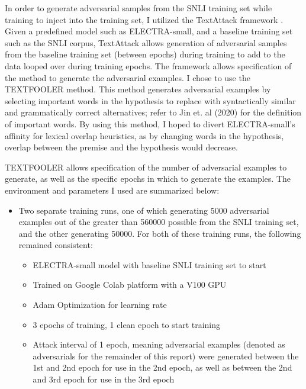 \documentclass[11pt,a4paper]{article}
\begin{document}
In order to generate adversarial samples from the SNLI training set while training to inject into the training set, I utilized the TextAttack framework \cite{DBLP:journals/corr/abs-2005-05909}. Given a predefined model such as ELECTRA-small, and a baseline training set such as the SNLI corpus, TextAttack allows generation of adversarial samples from the baseline training set (between epochs) during training to add to the data looped over during training epochs. The framework allows specification of the method to generate the adversarial examples. I chose to use the TEXTFOOLER \cite{DBLP:journals/corr/abs-1907-11932} method. This method generates adversarial examples by selecting important words in the hypothesis to replace with syntactically similar and grammatically correct alternatives; refer to Jin et. al (2020) for the definition of important words. By using this method, I hoped to divert ELECTRA-small's affinity for lexical overlap heuristics, as by changing words in the hypothesis, overlap between the premise and the hypothesis would decrease.

TEXTFOOLER allows specification of the number of adversarial examples to generate, as well as the specific epochs in which to generate the examples. The environment and parameters I used are summarized below:

\begin{itemize}
\tiny
\item Two separate training runs, one of which generating 5000 adversarial examples out of the greater than 560000 possible from the SNLI training set, and the other generating 50000. For both of these training runs, the following remained consistent:
\begin{itemize}
    \item ELECTRA-small model with baseline SNLI training set to start
    \item Trained on Google Colab platform with a V100 GPU
    \item Adam Optimization for learning rate
    \item 3 epochs of training, 1 clean epoch to start training
    \item Attack interval of 1 epoch, meaning adversarial examples (denoted as adversarials for the remainder of this report) were generated between the 1st and 2nd epoch for use in the 2nd epoch, as well as between the 2nd and 3rd epoch for use in the 3rd epoch
\end{itemize}
\end{itemize}
\end{document}
